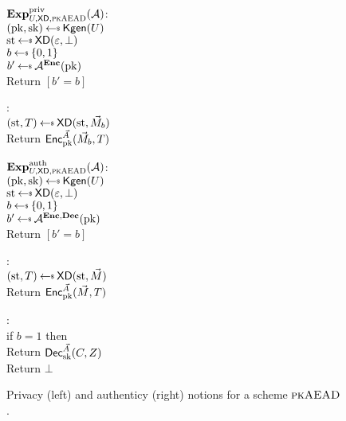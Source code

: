 \begin{figure}[tbhp]
\begin{center}
{
\underline{$\mathbf{Exp}^{\mathrm{priv}}_{U,\mathsf{XD},\textsc{pkAEAD}}{({\cal A})}$}:\\[2pt]
 $(\pk,\sk)\getsr\Kgen(\kreg)$\\
 $\st \getsr \mdalg(\emptystring,\bot)$\\
 $b\getsr\bits$\\
 $b'\getsr\advA^{\encOracle}(\pk)$\\
 Return $[b'=b]$

\medskip
{}:\\[2pt]
$(\st,\umd) \getsr \mdalg(\st,\vmsg_b)$\\
 Return ${\mathsf{Enc}}_{\mathrm{pk}}^{\vec{A}}(\vec{M}_b, T)$

}
{
\underline{$\mathbf{Exp}^{\mathrm{auth}}_{U,\mathsf{XD},\textsc{pkAEAD}}{({\cal A})}$}:\\[2pt]
 $(\pk,\sk)\getsr\Kgen(\kreg)$\\
 $\st \getsr \mdalg(\emptystring,\bot)$\\
 $b\getsr\bits$\\
 $b'\getsr\advA^{\encOracle,\decOracle}(\pk)$\\
 Return $[b'=b]$

\medskip
\Oracle{$\encOracle(\vad,\vmsg)$}:\\[2pt]
 $(\st,\umd) \getsr \mdalg(\st,\vmsg)$\\
 Return ${\mathsf{Enc}}_{\mathrm{pk}}^{\vec{A}}(\vec{M},T)$

\medskip
{}:\\[2pt]
 if $b=1$ then\\
 \nudge Return ${\mathsf{Dec}}_{\mathrm{sk}}^{\vec{A}}(C,Z)$\\
Return $\bot$
}
\caption{Privacy (left) and authenticy (right) notions for a scheme $\textsc{pkAEAD}$.}
\label{fig:pkaead-notions}
\end{center}
\end{figure}



